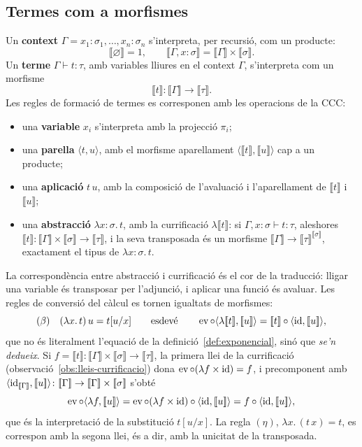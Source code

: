 \subsection{Termes com a morfismes}

Un \textbf{context} $\Gamma=x_1:\sigma_1,\dots,x_n:\sigma_n$ s'interpreta, per recursió, com un producte:
\[
\llbracket\varnothing\rrbracket=1,
\qquad
\llbracket\Gamma,x:\sigma\rrbracket=\llbracket\Gamma\rrbracket\times\llbracket\sigma\rrbracket.
\]
Un \textbf{terme} $\Gamma\vdash t:\tau$, amb variables lliures en el context $\Gamma$, s'interpreta com un morfisme
\[
\llbracket t\rrbracket\colon\llbracket\Gamma\rrbracket\longrightarrow\llbracket\tau\rrbracket.
\]
Les regles de formació de termes es corresponen amb les operacions de la CCC:
\begin{itemize}
\item una \textbf{variable} $x_i$ s'interpreta amb la projecció $\pi_i$;
\item una \textbf{parella} $\langle t,u\rangle$, amb el morfisme aparellament $\langle\llbracket t\rrbracket,\llbracket u\rrbracket\rangle$ cap a un producte;
\item una \textbf{aplicació} $t\,u$, amb la composició de l'avaluació i l'aparellament de $\llbracket t\rrbracket$ i $\llbracket u\rrbracket$;
\item una \textbf{abstracció} $\lambda x{:}\sigma.\,t$, amb la currificació $\lambda\llbracket t\rrbracket$: si $\Gamma,x:\sigma\vdash t:\tau$, aleshores $\llbracket t\rrbracket\colon\llbracket\Gamma\rrbracket\times\llbracket\sigma\rrbracket\to\llbracket\tau\rrbracket$, i la seva transposada és un morfisme $\llbracket\Gamma\rrbracket\to\llbracket\tau\rrbracket^{\llbracket\sigma\rrbracket}$, exactament el tipus de $\lambda x{:}\sigma.\,t$.
\end{itemize}
La correspondència entre abstracció i currificació és el cor de la traducció: lligar una variable és transposar per l'adjunció, i aplicar una funció és avaluar. Les regles de conversió del càlcul es tornen igualtats de morfismes:
\[
(\beta)\quad(\lambda x.\,t)\,u = t[u/x]
\qquad\text{esdevé}\qquad
\ev\comp\langle\lambda\llbracket t\rrbracket,\llbracket u\rrbracket\rangle=\llbracket t\rrbracket\comp\langle\id,\llbracket u\rrbracket\rangle,
\]
que no és literalment l'equació de la definició~\ref{def:exponencial}, sinó que \emph{se'n dedueix}. Si $f=\llbracket t\rrbracket\colon\llbracket\Gamma\rrbracket\times\llbracket\sigma\rrbracket\to\llbracket\tau\rrbracket$, la primera llei de la currificació (observació~\ref{obs:lleis-currificacio}) dona $\operatorname{ev}\circ(\lambda f\times\operatorname{id})=f$, i precomponent amb $\langle\id_{\llbracket\Gamma\rrbracket},\llbracket u\rrbracket\rangle\colon\llbracket\Gamma\rrbracket\to\llbracket\Gamma\rrbracket\times\llbracket\sigma\rrbracket$ s'obté
\[
\operatorname{ev}\circ\langle\lambda f,\mathopen{[\![} u\mathclose{]\!]}\rangle
=\operatorname{ev}\circ(\lambda f\times\operatorname{id})\circ\langle\operatorname{id},\mathopen{[\![} u\mathclose{]\!]}\rangle
=f\circ\langle\operatorname{id},\mathopen{[\![} u\mathclose{]\!]}\rangle,
\]
que és la interpretació de la substitució $t[u/x]$. La regla $(\eta)$, $\lambda x.\,(t\,x)=t$, es correspon amb la segona llei, és a dir, amb la unicitat de la transposada.

